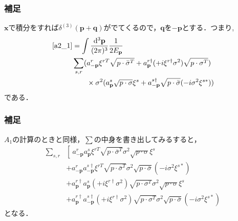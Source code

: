 \documentclass[pdflatex,unicode,ja=standard,12pt]{beamer}
\begin{document}
\begin{frame}[noframenumbering]
  
  \frametitle{補足\ \subsecname}
  \thispagestyle{empty}

  $\mathbf{x}$で積分をすれば$\delta^{(3)}(\mathbf{p}+\mathbf{q})$がでてくるので，$\mathbf{q}$を$-\mathbf{p}$とする．つまり,
  \begin{align}
    \eqref{a2_1}
    &=
    \int\frac{\dd^3\mathbf{p}}{(2\pi)^3}\frac{1}{2E_{\mathbf{p}}}
    \nonumber
    \\
    &
    \sum_{s,r}
    (
      a_{-\mathbf{p}}^{r}\xi^{rT}\sqrt{p\cdot\bar{\sigma}^{T}}
      +
      a_{\mathbf{p}}^{r\dag}(+i\xi^{r\dag}\sigma^2)\sqrt{p\cdot\sigma^{T}}
    )
    \nonumber
    \\
    &\qquad
    \times\sigma^2
    (
      a_{\mathbf{p}}^s\sqrt{p\cdot\sigma}\xi^s
      +
      a_{-\mathbf{p}}^{s\dag}\sqrt{p\cdot\bar{\sigma}}(-i\sigma^2\xi^{s*})
    )
  \end{align}
  である．  

\end{frame}


\begin{frame}[noframenumbering]
  
  \frametitle{補足\ \subsecname}
  \thispagestyle{empty}

  $A_1$の計算のときと同様，$\sum$の中身を書き出してみるすると，
  \begin{align}
    \sum_{s,r}
    &
    \left[\ 
      a_{-\mathbf{p}}^ra_{\mathbf{p}}^s
      \xi^{rT}\sqrt{p\cdot\bar{\sigma}^{T}}
      \sigma^2
      \sqrt{p\cdot\sigma}\xi^s
    \right.
    \nonumber
    \\
    &
    +
    a_{-\mathbf{p}}^ra_{-\mathbf{p}}^{s\dag}
    \xi^{rT}\sqrt{p\cdot\bar{\sigma}^{T}}
    \sigma^2
    \sqrt{p\cdot\bar{\sigma}}(-i\sigma^2\xi^{s*})
    \nonumber
    \\
    &
    +
    a_{\mathbf{p}}^{r\dag}a_{\mathbf{p}}^s
    (+i\xi^{r\dag}\sigma^2)\sqrt{p\cdot\sigma^{T}}
    \sigma^2
    \sqrt{p\cdot\sigma}\xi^s
    \nonumber
    \\
    &
    +
    a_{\mathbf{p}}^{r\dag}a_{-\mathbf{p}}^{s\dag}
    (+i\xi^{r\dag}\sigma^2)\sqrt{p\cdot\sigma^{T}}
    \sigma^2
    \sqrt{p\cdot\bar{\sigma}}(-i\sigma^2\xi^{s*})
  \end{align}
  となる．

\end{frame}
\end{document}
